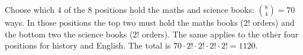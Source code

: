 Choose which $4$ of the $8$ positions hold the maths and science books: $\binom84=70$ ways. In those positions the top two must hold the maths books ($2!$ orders) and the bottom two the science books ($2!$ orders). The same applies to the other four positions for history and English. The total is $70\cdot2!\cdot2!\cdot2!\cdot2!=\boxed{1120}$.

